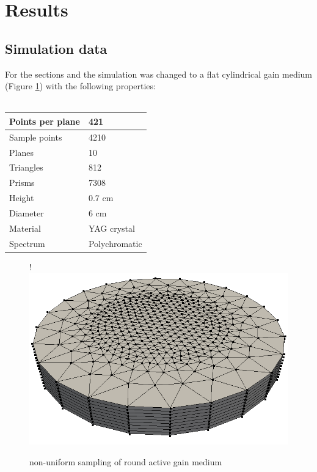 \section{Results}

\subsection{Simulation data}
For the sections  and  
the simulation was changed to a flat 
cylindrical gain medium (Figure \ref{graphic:samples_round}) with the following
properties:
\\
\\ 
\begin{tabular}{| l | l |}
\hline
Points per plane        & 421\\
\hline
Sample points           & 4210\\
\hline
Planes                  & 10\\
\hline
Triangles               & 812\\
\hline
Prisms                  & 7308\\
\hline
Height                  & 0.7 cm\\
\hline
Diameter                & 6 cm\\
\hline
Material                & YAG crystal\\
\hline
Spectrum                & Polychromatic\\
\hline
\end{tabular}

\begin{figure}[H]
  \centerline{
     {!} {\includegraphics{graphics/samples_round.png}}
  }
  \caption{non-uniform sampling of round active gain medium}
  \label{graphic:samples_round}
\end{figure}

